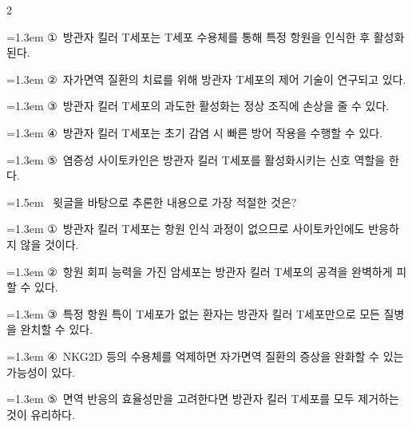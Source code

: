 \documentclass[10pt, a4paper]{article}
\begin{document}
\begin{multicols}{2}
\begin{minipage}{\columnwidth}
\vspace{0.5mm}
{\hangindent=1.3em  \noindent\hspace{0.3em}①~방관자 킬러 T세포는 T세포 수용체를 통해 특정 항원을 인식한 후 활성화된다.\par}
{\hangindent=1.3em  \noindent\hspace{0.3em}②~자가면역 질환의 치료를 위해 방관자 T세포의 제어 기술이 연구되고 있다.\par}
{\hangindent=1.3em  \noindent\hspace{0.3em}③~방관자 킬러 T세포의 과도한 활성화는 정상 조직에 손상을 줄 수 있다.\par}
{\hangindent=1.3em  \noindent\hspace{0.3em}④~방관자 킬러 T세포는 초기 감염 시 빠른 방어 작용을 수행할 수 있다.\par}
{\hangindent=1.3em  \noindent\hspace{0.3em}⑤~염증성 사이토카인은 방관자 킬러 T세포를 활성화시키는 신호 역할을 한다.\par}
\vspace{4mm}
\end{minipage}
\par

\noindent\begin{minipage}{\columnwidth}
\vspace{2mm}
{\hangindent=1.5em  ~윗글을 바탕으로 추론한 내용으로 가장 적절한 것은?\par}

\vspace{0.5mm}
{\hangindent=1.3em  \noindent\hspace{0.3em}①~방관자 킬러 T세포는 항원 인식 과정이 없으므로 사이토카인에도 반응하지 않을 것이다.\par}
{\hangindent=1.3em  \noindent\hspace{0.3em}②~항원 회피 능력을 가진 암세포는 방관자 킬러 T세포의 공격을 완벽하게 피할 수 있다.\par}
{\hangindent=1.3em  \noindent\hspace{0.3em}③~특정 항원 특이 T세포가 없는 환자는 방관자 킬러 T세포만으로 모든 질병을 완치할 수 있다.\par}
{\hangindent=1.3em  \noindent\hspace{0.3em}④~NKG2D 등의 수용체를 억제하면 자가면역 질환의 증상을 완화할 수 있는 가능성이 있다.\par}
{\hangindent=1.3em  \noindent\hspace{0.3em}⑤~면역 반응의 효율성만을 고려한다면 방관자 킬러 T세포를 모두 제거하는 것이 유리하다.\par}
\vspace{4mm}
\end{minipage}
\par


\end{multicols}
\end{document}
